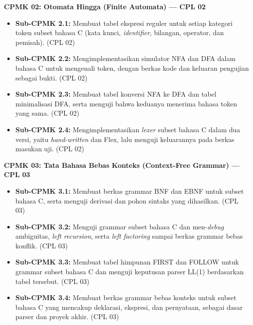 \documentclass[12pt,a4paper]{article}
\begin{document}
\vspace{0.2cm}

\noindent\textbf{CPMK 02: Otomata Hingga (Finite Automata) --- CPL 02}
\begin{itemize}[leftmargin=*]
  \item \textbf{Sub-CPMK 2.1:} Membuat tabel ekspresi reguler untuk setiap kategori token subset bahasa C (kata kunci, \textit{identifier}, bilangan, operator, dan pemisah). (CPL 02)
  \item \textbf{Sub-CPMK 2.2:} Mengimplementasikan simulator NFA dan DFA dalam bahasa C untuk mengenali token, dengan berkas kode dan keluaran pengujian sebagai bukti. (CPL 02)
  \item \textbf{Sub-CPMK 2.3:} Membuat tabel konversi NFA ke DFA dan tabel minimalisasi DFA, serta menguji bahwa keduanya menerima bahasa token yang sama. (CPL 02)
  \item \textbf{Sub-CPMK 2.4:} Mengimplementasikan \textit{lexer} subset bahasa C dalam dua versi, yaitu \textit{hand-written} dan Flex, lalu menguji keluarannya pada berkas masukan uji. (CPL 02)
\end{itemize}

\vspace{0.2cm}

\noindent\textbf{CPMK 03: Tata Bahasa Bebas Konteks (Context-Free Grammar) --- CPL 03}
\begin{itemize}[leftmargin=*]
  \item \textbf{Sub-CPMK 3.1:} Membuat berkas grammar BNF dan EBNF untuk subset bahasa C, serta menguji derivasi dan pohon sintaks yang dihasilkan. (CPL 03)
  \item \textbf{Sub-CPMK 3.2:} Menguji grammar subset bahasa C dan men-\textit{debug} ambiguitas, \textit{left recursion}, serta \textit{left factoring} sampai berkas grammar bebas konflik. (CPL 03)
  \item \textbf{Sub-CPMK 3.3:} Membuat tabel himpunan FIRST dan FOLLOW untuk grammar subset bahasa C dan menguji keputusan parser LL(1) berdasarkan tabel tersebut. (CPL 03)
  \item \textbf{Sub-CPMK 3.4:} Membuat berkas grammar bebas konteks untuk subset bahasa C yang mencakup deklarasi, ekspresi, dan pernyataan, sebagai dasar parser dan proyek akhir. (CPL 03)
\end{itemize}

\vspace{0.2cm}
\end{document}
